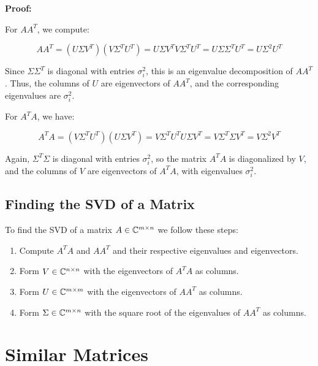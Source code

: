 \textbf{Proof:}

For \( AA^T \), we compute:

\[
    AA^T = (U \Sigma V^T)(V \Sigma^T U^T) = U \Sigma V^T V \Sigma^T U^T = U \Sigma \Sigma^T U^T = U \Sigma^2 U^T
\]

Since \( \Sigma\Sigma^T \) is diagonal with entries \( \sigma_i^2 \), this is an eigenvalue decomposition of 
\( AA^T \). Thus, the columns of \( U \) are eigenvectors of \( AA^T \), and the corresponding eigenvalues 
are \( \sigma_i^2 \).

For \( A^T A \), we have:

\[
    A^T A = (V \Sigma^T U^T)(U \Sigma V^T) = V \Sigma^T U^T U \Sigma V^T = V \Sigma^T \Sigma V^T = V \Sigma^2 V^T
\]

Again, \( \Sigma^T \Sigma \) is diagonal with entries \( \sigma_i^2 \), so the matrix \( A^T A \) is diagonalized 
by \( V \), and the columns of \( V \) are eigenvectors of \( A^T A \), with eigenvalues \( \sigma_i^2 \).

\QED

\subsection{Finding the SVD of a Matrix}

To find the SVD of a matrix \(A \in \mathbb{C}^{m \times n}\) we follow these steps:

\begin{enumerate}
   
    \item Compute \(A^T A\) and \(AA^T\) and their respective eigenvalues and eigenvectors.

    \item Form \(V \in \mathbb{C}^{n \times n}\) with the eigenvectors of \(A^T A\) as columns.
    
    \item Form \(U \in \mathbb{C}^{m \times m}\) with the eigenvectors of \(AA^T\) as columns.

    \item Form \(\Sigma \in \mathbb{C}^{m \times n}\) with the square root of the eigenvalues of \(AA^T\) as columns.

\end{enumerate}
    
\section{Similar Matrices}

